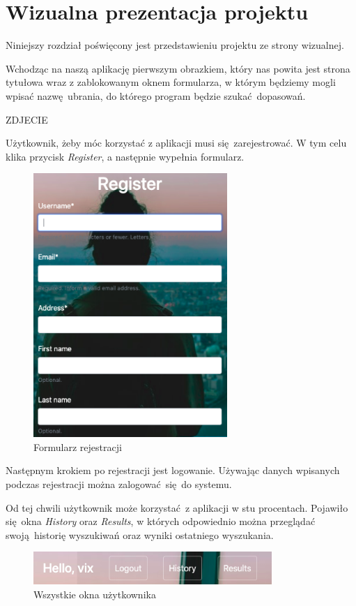 \chapter {Wizualna prezentacja projektu} 

Niniejszy rozdział poświęcony jest przedstawieniu projektu ze strony wizualnej.

Wchodząc na naszą aplikację pierwszym obrazkiem, który nas powita jest strona tytułowa wraz z zablokowanym oknem formularza, w którym będziemy mogli wpisać nazwę ubrania, do którego program będzie szukać dopasowań.

ZDJECIE

Użytkownik, żeby móc korzystać z aplikacji musi się zarejestrować. W tym celu klika przycisk \emph{Register}, a następnie wypełnia formularz.

\begin{figure}[h]
    \includegraphics[height=10cm]{registration}
    \caption{Formularz rejestracji}
\end{figure}

\newpage
Następnym krokiem po rejestracji jest logowanie. Używając danych wpisanych podczas rejestracji można zalogować się do systemu.

Od tej chwili użytkownik może korzystać z aplikacji w stu procentach.\newline
Pojawiło się okna \emph{History} oraz \emph {Results}, w których odpowiednio można przeglądać swoją historię wyszukiwań oraz wyniki ostatniego wyszukania.
\begin{figure}[h]
    \includegraphics{history_results}
    \caption{Wszystkie okna użytkownika}
\end{figure}

